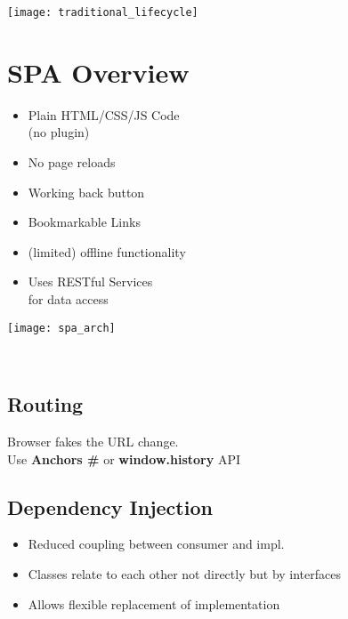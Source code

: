 

\newcommand{\TITLE}{Web Engineering 3}
\newcommand{\AUTHOR}{Mona Panchaud}
\newcommand{\INSTITUTE}{Ostschweizer Fachhochschule}




\begin{multicols*}{4}

\texttt{[image: traditional\_lifecycle]}


\section{SPA Overview}


\begin{minipage}[c]{.6\linewidth}
    \begin{itemize}
        \item Plain HTML/CSS/JS Code \\(no plugin)
        \item No page reloads
        \item Working back button
        \item Bookmarkable Links
        \item (limited) offline functionality
        \item Uses RESTful Services \\for data access
    \end{itemize}
\end{minipage}%
\begin{minipage}[c]{.4\linewidth}
    \texttt{[image: spa\_arch]}
\end{minipage}%
\\ %

\subsection{Routing}
Browser fakes the URL change.
\\
Use \textbf{Anchors \#} or \textbf{window.history} API

\subsection{Dependency Injection}
\begin{itemize}
    \item Reduced coupling between consumer and impl.
    \item Classes relate to each other not directly but by interfaces
    \item Allows flexible replacement of implementation
\end{itemize}


\end{multicols*}
